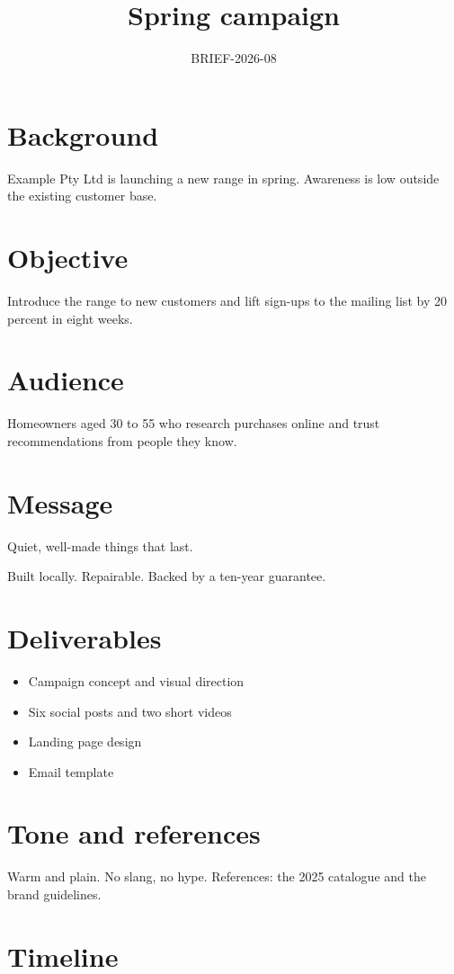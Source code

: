 \documentclass{jupiter-form}
\title{Spring campaign}
\subtitle{BRIEF-2026-08}
\begin{document}
\maketitle
{}
\jprowend

\section{Background}
Example Pty Ltd is launching a new range in spring. Awareness is low outside the existing customer base.

\section{Objective}
Introduce the range to new customers and lift sign-ups to the mailing list by 20 percent in eight weeks.

\section{Audience}
Homeowners aged 30 to 55 who research purchases online and trust recommendations from people they know.

\section{Message}
Quiet, well-made things that last.

Built locally. Repairable. Backed by a ten-year guarantee.

\section{Deliverables}
\begin{itemize}
  \item Campaign concept and visual direction
  \item Six social posts and two short videos
  \item Landing page design
  \item Email template
\end{itemize}

\section{Tone and references}
Warm and plain. No slang, no hype. References: the 2025 catalogue and the brand guidelines.

\section{Timeline}
\end{document}
